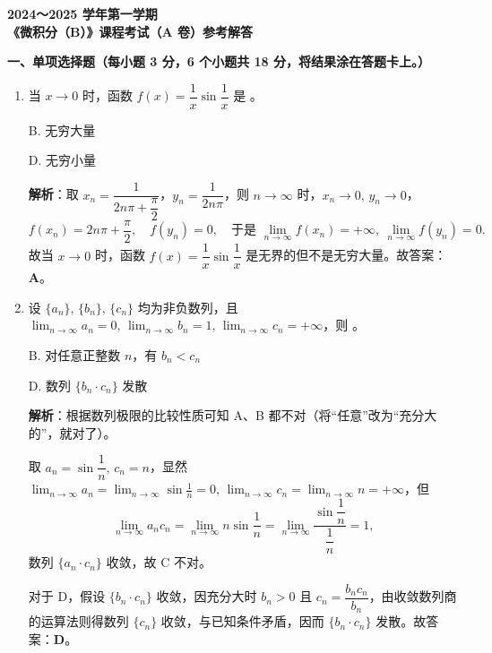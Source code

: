 \documentclass[a4paper,11pt]{ctexart}
\newcommand{\choice}[1]{\text{【\quad】}}
\begin{document}
\begin{center}
  {\Large\bfseries 2024～2025 学年第一学期}\\[0.5em]
  {\Large\bfseries 《微积分（B）》课程考试（A 卷）参考解答}
\end{center}

\vspace{0.6em}

\textbf{一、单项选择题（每小题 3 分，6 个小题共 18 分，将结果涂在答题卡上。）}

\begin{enumerate}[label=\arabic*., leftmargin=2em, itemsep=0.75em, topsep=0.5em]
  \item 当 $x\to 0$ 时，函数 $f(x)=\dfrac{1}{x}\sin\dfrac{1}{x}$ 是 \choice{}。

  B. 无穷大量

  D. 无穷小量

  \textbf{解析}：取 $x_n=\dfrac{1}{2n\pi+\dfrac{\pi}{2}}$，$y_n=\dfrac{1}{2n\pi}$，则 $n\to\infty$ 时，$x_n\to 0,\,y_n\to 0$，
  \[
    f(x_n)=2n\pi+\frac{\pi}{2},\quad f(y_n)=0,\quad\text{于是 }\lim_{n\to\infty}f(x_n)=+\infty,\ \lim_{n\to\infty}f(y_n)=0.
  \]
  故当 $x\to 0$ 时，函数 $f(x)=\dfrac{1}{x}\sin\dfrac{1}{x}$ 是无界的但不是无穷大量。故答案：\textbf{A}。

  \item 设 $\{a_n\},\,\{b_n\},\,\{c_n\}$ 均为非负数列，且 $\displaystyle\lim_{n\to\infty}a_n=0,\,\lim_{n\to\infty}b_n=1,\,\lim_{n\to\infty}c_n=+\infty$，则 \choice{}。

  B. 对任意正整数 $n$，有 $b_n<c_n$

  D. 数列 $\{b_n\cdot c_n\}$ 发散

  \textbf{解析}：根据数列极限的比较性质可知 A、B 都不对（将“任意”改为“充分大的”，就对了）。

  取 $a_n=\sin\dfrac{1}{n},\,c_n=n$，显然 $\displaystyle\lim_{n\to\infty}a_n=\lim_{n\to\infty}\sin\frac{1}{n}=0,\,\lim_{n\to\infty}c_n=\lim_{n\to\infty}n=+\infty$，但
  \[
    \lim_{n\to\infty}a_n c_n=\lim_{n\to\infty}n\sin\frac{1}{n}=\lim_{n\to\infty}\frac{\sin\dfrac{1}{n}}{\dfrac{1}{n}}=1,
  \]
  数列 $\{a_n\cdot c_n\}$ 收敛，故 C 不对。

  对于 D，假设 $\{b_n\cdot c_n\}$ 收敛，因充分大时 $b_n>0$ 且 $c_n=\dfrac{b_n c_n}{b_n}$，由收敛数列商的运算法则得数列 $\{c_n\}$ 收敛，与已知条件矛盾，因而 $\{b_n\cdot c_n\}$ 发散。故答案：\textbf{D}。


\end{enumerate}
\end{document}
